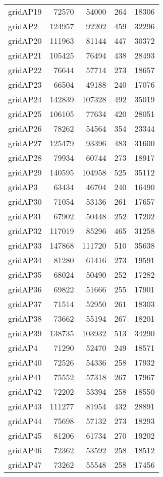 \begin{tabular}{lrrrr}
gridAP19 & 72570 & 54000 & 264 & 18306 \\
gridAP2 & 124957 & 92202 & 459 & 32296 \\
gridAP20 & 111963 & 81144 & 447 & 30372 \\
gridAP21 & 105425 & 76494 & 438 & 28493 \\
gridAP22 & 76644 & 57714 & 273 & 18657 \\
gridAP23 & 66504 & 49188 & 240 & 17076 \\
gridAP24 & 142839 & 107328 & 492 & 35019 \\
gridAP25 & 106105 & 77634 & 420 & 28051 \\
gridAP26 & 78262 & 54564 & 354 & 23344 \\
gridAP27 & 125479 & 93396 & 483 & 31600 \\
gridAP28 & 79934 & 60744 & 273 & 18917 \\
gridAP29 & 140595 & 104958 & 525 & 35112 \\
gridAP3 & 63434 & 46704 & 240 & 16490 \\
gridAP30 & 71054 & 53136 & 261 & 17657 \\
gridAP31 & 67902 & 50448 & 252 & 17202 \\
gridAP32 & 117019 & 85296 & 465 & 31258 \\
gridAP33 & 147868 & 111720 & 510 & 35638 \\
gridAP34 & 81280 & 61416 & 273 & 19591 \\
gridAP35 & 68024 & 50490 & 252 & 17282 \\
gridAP36 & 69822 & 51666 & 255 & 17901 \\
gridAP37 & 71514 & 52950 & 261 & 18303 \\
gridAP38 & 73662 & 55194 & 267 & 18201 \\
gridAP39 & 138735 & 103932 & 513 & 34290 \\
gridAP4 & 71290 & 52470 & 249 & 18571 \\
gridAP40 & 72526 & 54336 & 258 & 17932 \\
gridAP41 & 75552 & 57318 & 267 & 17967 \\
gridAP42 & 72202 & 53394 & 258 & 18550 \\
gridAP43 & 111277 & 81954 & 432 & 28891 \\
gridAP44 & 75698 & 57132 & 273 & 18293 \\
gridAP45 & 81206 & 61734 & 270 & 19202 \\
gridAP46 & 72362 & 53592 & 258 & 18512 \\
gridAP47 & 73262 & 55548 & 258 & 17456 \\

\end{tabular}

